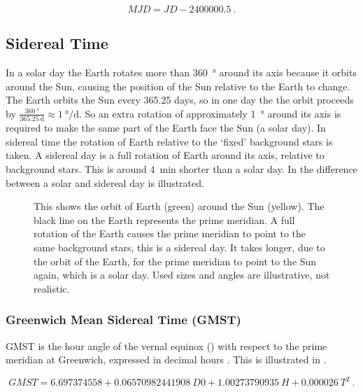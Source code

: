 \begin{equation}
    \mathit{MJD} = \mathit{JD} - 2400000.5 \ .
\end{equation}


\subsection{Sidereal Time}

In a solar day the Earth rotates more than \SI{360}{\degree} around its
axis because it orbits around the Sun, causing the position of the Sun
relative to the Earth to change. The Earth orbits the Sun every 365.25
days, so in one day the the orbit proceeds by
$\frac{\SI{360}{\degree}}{\SI{365.25}{\day}} \approx
\SI{1}{\degree\per\day}$. So an extra rotation of approximately
\SI{1}{\degree} around its axis is required to make the same part of the
Earth face the Sun (a solar day). In sidereal time the rotation of Earth
relative to the `fixed' background stars is taken. A sidereal day is a
full rotation of Earth around its axis, relative to background stars.
This is around \SI{4}{\minute} shorter than a solar day. In
 the difference between a solar and sidereal
day is illustrated.

\begin{figure}
    \centering
    
    \caption{This shows the orbit of Earth (green) around the Sun
             (yellow). The black line on the Earth represents the prime
             meridian. A full rotation of the Earth causes the prime
             meridian to point to the same background stars, this is a
             sidereal day. It takes longer, due to the orbit of the
             Earth, for the prime meridian to point to the Sun again,
             which is a solar day. Used sizes and angles are
             illustrative, not realistic.}
    \label{fig:sidereal_time}
\end{figure}


\subsubsection{Greenwich Mean Sidereal Time (GMST)}

GMST is the hour angle of the vernal equinox ()
with respect to the prime meridian at Greenwich, expressed in decimal
hours \cite{kaplan:2011aa}. This is illustrated in
.

\begin{equation}
    \mathit{GMST} = 6.697374558 + 0.06570982441908\ \mathit{D0} +
                    1.00273790935\ H + 0.000026\ T^2 \ .
\end{equation}

